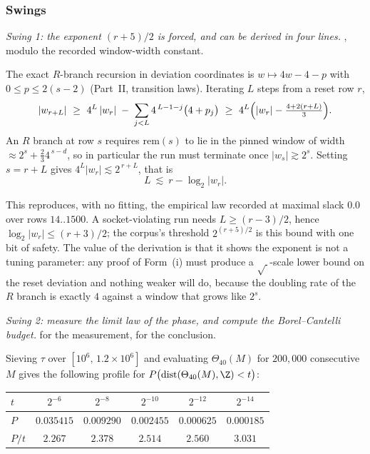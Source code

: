 \subsubsection*{Swings}

\emph{Swing 1: the exponent $(r+5)/2$ is forced, and can be derived in four lines.} ,
modulo the recorded window-width constant.

The exact $R$-branch recursion in deviation coordinates is $w\mapsto 4w-4-p$ with
$0\le p\le 2(s-2)$ (Part~II, transition laws). Iterating $L$ steps from a reset row $r$,
\[
|w_{r+L}|\ \ge\ 4^{L}\,|w_r|\;-\;\sum_{j<L}4^{\,L-1-j}\bigl(4+p_j\bigr)
\ \ge\ 4^{L}\Bigl(|w_r| - \tfrac{4+2(r+L)}{3}\Bigr).
\]
An $R$ branch at row $s$ requires $\mathrm{rem}(s)$ to lie in the pinned window of width
$\approx 2^{s}+\tfrac23 4^{\,s-d}$, so in particular the run must terminate once
$|w_s|\gtrsim 2^{s}$. Setting $s=r+L$ gives $4^{L}|w_r|\lesssim 2^{\,r+L}$, that is
\[
L\ \lesssim\ r-\log_2|w_r|.
\]

This reproduces, with no fitting, the empirical law recorded at maximal slack $0.0$ over rows
$14..1500$. A socket-violating run needs $L\ge (r-3)/2$, hence
$\log_2|w_r|\le (r+3)/2$; the corpus's threshold $2^{(r+5)/2}$ is this bound with one bit of
safety. The value of the derivation is that it shows the exponent is not a tuning parameter: any
proof of Form~(i) must produce a $\sqrt{\ }$-scale lower bound on the reset deviation and nothing
weaker will do, because the doubling rate of the $R$ branch is exactly $4$ against a window that
grows like $2^{s}$.

\emph{Swing 2: measure the limit law of the phase, and compute the Borel--Cantelli budget.}
 for the measurement,  for the conclusion.

Sieving $\tau$ over $[10^6,\,1.2\times10^6]$ and evaluating $\Theta_{40}(M)$ for $200{,}000$
consecutive $M$ gives the following profile for $P\bigl(\mathrm{dist}(\Theta_{40}(M),\Z)<t\bigr)$:
\begin{center}
\begin{tabular}{lccccc}
\hline
$t$ & $2^{-6}$ & $2^{-8}$ & $2^{-10}$ & $2^{-12}$ & $2^{-14}$\\
\hline
$P$ & $0.035415$ & $0.009290$ & $0.002455$ & $0.000625$ & $0.000185$\\
$P/t$ & $2.267$ & $2.378$ & $2.514$ & $2.560$ & $3.031$\\
\hline
\end{tabular}
\end{center}

